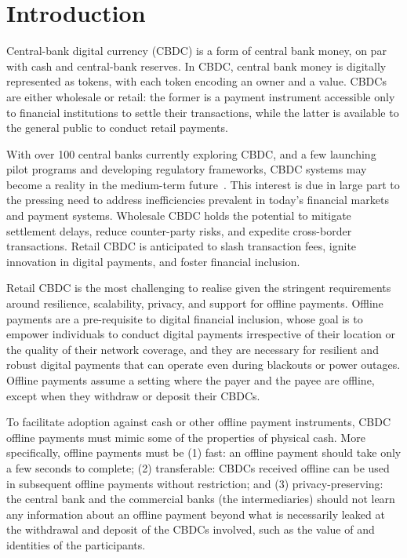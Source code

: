 \section{Introduction}\label{sec:offline-intro}

Central-bank digital currency (CBDC) is a form of central bank money, on par
with cash and central-bank reserves. In CBDC, central bank money is digitally
represented as tokens, with each token encoding an owner and a
value. CBDCs are either wholesale or retail: the former is
a payment instrument accessible only to financial institutions to settle their
transactions, while the latter is available to the general public to conduct
retail payments.

With over 100 central banks currently exploring CBDC, and a
few launching pilot programs and developing regulatory frameworks, CBDC systems
may become a reality in the medium-term future~\cite{cbdctracker}. This interest is due in large
part to the pressing need to address inefficiencies prevalent in today's
financial markets and payment systems. Wholesale CBDC holds the potential to
mitigate settlement delays, reduce counter-party risks, and expedite
cross-border transactions. Retail CBDC is anticipated to slash transaction
fees, ignite innovation in digital payments, and foster financial inclusion.

Retail CBDC is the most challenging to realise given the stringent
requirements around resilience, scalability, privacy, and support for
offline payments. Offline payments are a pre-requisite to digital
financial inclusion, whose goal is to empower individuals to conduct digital
payments irrespective of their location or the quality of their network
coverage, and they are necessary for resilient and robust digital payments
that can operate even during blackouts or power outages. Offline payments
assume a setting where the payer and the payee are offline, except when they
withdraw or deposit their CBDCs.

To facilitate adoption against cash or other offline payment instruments, CBDC
offline payments must mimic some of the properties of physical cash. More
specifically, offline payments must be (1) fast: an offline payment
should take only a few seconds to complete; (2) transferable: CBDCs
received offline can be used in subsequent offline payments without
restriction; and (3) privacy-preserving: the central bank and the
commercial banks (the intermediaries) should not learn any information about
an offline payment beyond what is necessarily leaked at the withdrawal and
deposit of the CBDCs involved, such as the value of and identities of the
participants.


